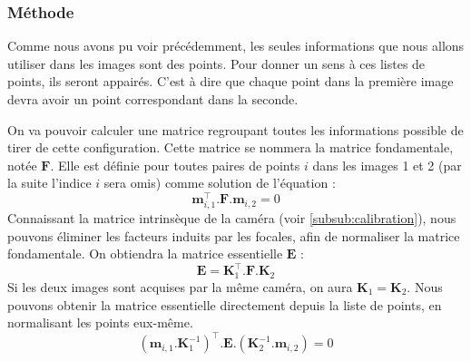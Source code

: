 \subsubsection{Méthode}
\label{subsub:reconstruction}

Comme nous avons pu voir précédemment, les seules informations que nous allons utiliser dans les images sont des points.
Pour donner un sens à ces listes de points, ils seront appairés.
C'est à dire que chaque point dans la première image devra avoir un point correspondant dans la seconde.

On va pouvoir calculer une matrice regroupant toutes les informations possible de tirer de cette configuration.
Cette matrice se nommera la matrice fondamentale, notée $\mathbf{F}$.
Elle est définie pour toutes paires de points $i$ dans les images 1 et 2 (par la suite l'indice $i$ sera omis) comme solution de l'équation :
\begin{equation}
\mathbf{m}_{i,1}^ \top.\mathbf{F}.\mathbf{m}_{i,2} = 0
\label{eq:fondamentale}
\end{equation}
Connaissant la matrice intrinsèque de la caméra (voir \ref{subsub:calibration}), nous pouvons éliminer les facteurs induits par les focales, afin de normaliser la matrice fondamentale.
On obtiendra la matrice essentielle $\mathbf{E}$ :
\begin{equation}
\mathbf{E} = \mathbf{K}_1^{\top} . \mathbf{F} . \mathbf{K}_2
\end{equation}
Si les deux images sont acquises par la même caméra, on aura $\mathbf{K}_1 = \mathbf{K}_2$.
Nous pouvons obtenir la matrice essentielle directement depuis la liste de points, en normalisant les points eux-même.
\begin{equation}
(\mathbf{m}_{i,1}.\mathbf{K}_1^{-1})^\top.\mathbf{E}.(\mathbf{K}_2^{-1}.\mathbf{m}_{i,2}) = 0
\label{eq:essentielle}
\end{equation}


